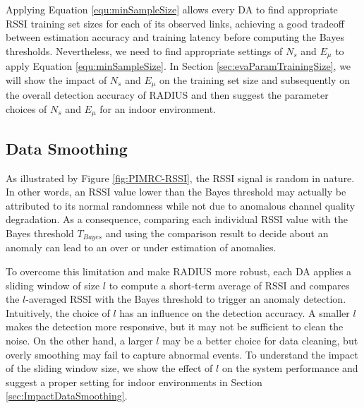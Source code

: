 Applying Equation \ref{equ:minSampleSize} allows every DA to find appropriate RSSI training set sizes for each of its observed links, achieving a good tradeoff between estimation accuracy and training latency before computing the Bayes thresholds. Nevertheless, we need to find appropriate settings of $N_s$ and $E_{\mu}$ to apply Equation \ref{equ:minSampleSize}. In Section \ref{sec:evaParamTrainingSize}, we will show the impact of $N_s$ and $E_{\mu}$ on the training set size and subsequently on the overall detection accuracy of RADIUS and then suggest the parameter choices of $N_s$ and $E_{\mu}$ for an indoor environment.

\subsection{Data Smoothing} \label{sec:dataSmoothing}

As illustrated by Figure \ref{fig:PIMRC-RSSI}, the RSSI signal is random in nature. In other words, an RSSI value lower than the Bayes threshold may actually be attributed to its normal randomness while not due to anomalous channel quality degradation. As a consequence, comparing each individual RSSI value with the Bayes threshold $T_{Bayes}$ and using the comparison result to decide about an anomaly can lead to an over or under estimation of anomalies.  

To overcome this limitation and make RADIUS more robust, each DA applies a sliding window of size $l$ to compute a short-term average of RSSI and compares the $l$-averaged RSSI with the Bayes threshold to trigger an anomaly detection. 
%
Intuitively, the choice of $l$ has an influence on the detection accuracy. A smaller $l$ makes the detection more responsive, but it may not be sufficient to clean the noise. On the other hand, a larger $l$ may be a better choice for data cleaning, but overly smoothing may fail to capture abnormal events. To understand the impact of the sliding window size, we show the effect of $l$ on the system performance and suggest a proper setting for indoor environments in Section \ref{sec:ImpactDataSmoothing}.


